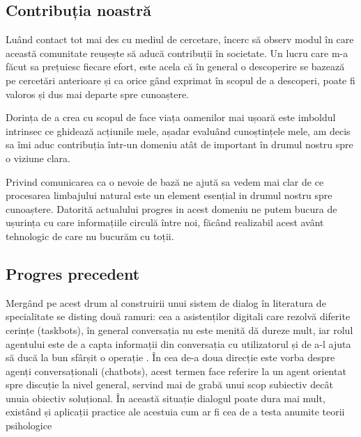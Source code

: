 
\subsection{Contribuția noastră}

Luând contact tot mai des cu mediul de cercetare, încerc să observ modul în care această comunitate reușește să aducă contribuții în societate. Un lucru care m-a făcut sa prețuiesc fiecare efort, este acela că în general o descoperire se bazează pe cercetări anterioare și ca orice gând exprimat în scopul de a descoperi, poate fi valoros și dus mai departe spre cunoaștere.

Dorința de a crea cu scopul de face viața oamenilor mai ușoară este imboldul intrinsec ce ghidează acțiunile mele, așadar evaluând cunoștințele mele, am decis sa îmi aduc contribuția într-un domeniu atât de important în drumul nostru spre o viziune clara.

Privind comunicarea ca o nevoie de bază ne ajută sa vedem mai clar de ce procesarea limbajului natural este un element esențial in drumul nostru spre cunoaștere. Datorită actualului progres in acest domeniu ne putem bucura de ușurința cu care informațiile circulă între noi, făcând realizabil acest avânt tehnologic de care nu bucurăm cu toții.



\subsection{Progres precedent}
Mergând pe acest drum al construirii unui sistem de dialog în literatura de specialitate se disting două ramuri: cea a asistenților digitali care rezolvă diferite cerințe (taskbots), în general conversația nu este menită dă dureze mult, iar rolul agentului este de a capta informații din conversația cu utilizatorul și de a-l ajuta să ducă la bun sfârșit o operație \cite{joint_online_bing, att_joint_bing}. În cea de-a doua direcție este vorba despre agenți conversaționali (chatbots), acest termen face referire la un agent orientat spre discuție la nivel general, servind mai de grabă unui scop subiectiv decât unuia obiectiv soluțional. În această situație dialogul poate dura mai mult, existând și aplicații practice ale acestuia cum ar fi cea de a testa anumite teorii psihologice \cite{weizenbaum}

